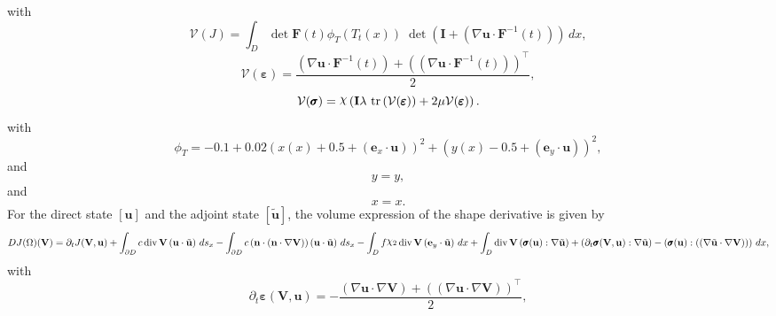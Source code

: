 \documentclass[preview]{standalone}
\let\oldcdot\cdot
\let\cdot\oldcdot
\begin{document}
with
\begin{dmath*}
\mathcal V(J) =  \int_{D}  \operatorname{det}\mathbf F( t )  \phi_{T}(T_t(x))  \;\operatorname{det}(\mathbf{I} + \left(  \nabla {\mathbf{ u }}  \cdot  \mathbf F^{-1}(t) \right))  \,dx,
 \end{dmath*}
\begin{dmath*}
\mathcal V(\pmb \varepsilon) = \frac{\left(  \nabla {\mathbf{ u }}  \cdot  \mathbf F^{-1}(t) \right) +  \left( \left(  \nabla {\mathbf{ u }}  \cdot  \mathbf F^{-1}(t) \right) \right)^\top }{2},
 \end{dmath*}
\begin{dmath*}
\mathcal V(\pmb \sigma) = \raisebox{\depth}{$\chi$} \left(\mathbf{I} \lambda  \,\operatorname{tr}\left(\mathcal V(\pmb \varepsilon)\right)  + 2 \mu \mathcal V(\pmb \varepsilon)\right).
 \end{dmath*}
with 
\begin{dmath*}
\phi_{T} = -0.1 + 0.02 \left(x(x) + 0.5 + \left( \mathbf e_x \cdot {\mathbf{ u }} \right)\right)^{2} + \left(y(x) - 0.5 + \left( \mathbf e_y \cdot {\mathbf{ u }} \right)\right)^{2},\end{dmath*}
and\begin{dmath*}
y = y,\end{dmath*}
and\begin{dmath*}
x = x.\end{dmath*}
For the direct state $\left[ {\mathbf{ u }}\right]$ and the adjoint state $\left[ \tilde{\mathbf{ u }}\right]$, the volume expression of the shape derivative is given by
\begin{dmath*}
DJ(\Omega)(\mathbf V) = \partial_{t} J({\mathbf V},{\mathbf{ u }}) +  \int_{\partial D} c \operatorname{div} {\mathbf V} \left( {\mathbf{ u }} \cdot \tilde{\mathbf{ u }} \right) \,ds_x -  \int_{\partial D} c \left( \mathbf n \cdot \left( \mathbf n \cdot  \nabla {\mathbf V}  \right) \right) \left( {\mathbf{ u }} \cdot \tilde{\mathbf{ u }} \right) \,ds_x -  \int_{D} f \raisebox{\depth}{$\chi_2$} \operatorname{div} {\mathbf V} \left( \mathbf e_y \cdot \tilde{\mathbf{ u }} \right) \,dx +  \int_{D} \operatorname{div} {\mathbf V} \left( \pmb \sigma({\mathbf{ u }}) \mathrel{:}  \nabla \tilde{\mathbf{ u }}  \right) + \left( \partial_{t} \pmb \sigma({\mathbf V},{\mathbf{ u }}) \mathrel{:}  \nabla \tilde{\mathbf{ u }}  \right) - \left( \pmb \sigma({\mathbf{ u }}) \mathrel{:} \left( \left(  \nabla \tilde{\mathbf{ u }}  \cdot  \nabla {\mathbf V}  \right) \right)\right) \,dx , 
\end{dmath*}
with
\begin{dmath*}
\partial_{t} \pmb \varepsilon({\mathbf V},{\mathbf{ u }}) = - \frac{\left(  \nabla {\mathbf{ u }}  \cdot  \nabla {\mathbf V}  \right) +  \left( \left(  \nabla {\mathbf{ u }}  \cdot  \nabla {\mathbf V}  \right) \right)^\top }{2},
 \end{dmath*}
\end{document}
